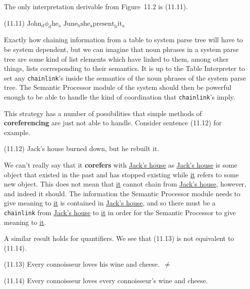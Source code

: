 \documentclass{article}
\begin{document}
The only interpretation derivable from Figure~11.2 is
(11.11).

\begin{enumerate*}
\item[(11.11)] ${\textrm{John}_{\textrm{d}}}$${\phi_{\textrm{d}}}$${\textrm{he}_{\textrm{a}}}$\qquad
${\textrm{June}_{\textrm{b}}}$${\textrm{she}_{\textrm{a}}}$\qquad ${\textrm{present}_{\textrm{b}}}$${\textrm{it}_{\textrm{a}}}$
\end{enumerate*}

Exactly how chaining information from a table to system parse
tree will have to be system dependent, but we can imagine that
noun phrases in a system parse tree are some kind of list
elements which have linked to them, among other things, lists
corresponding to their semantics. It is up to the Table
Interpreter to set any \texttt{chainlink}'s inside the semantics
of the noun phrases of the system parse tree. The Semantic
Processor module of the system should then be powerful enough to
be able to handle the kind of coordination that
\texttt{chainlink}'s imply.

This strategy has a number of possibilities that simple methods
of \textbf{coreferencing} are just not able to handle.  Consider
sentence (11.12) for example.

\begin{enumerate*}
\item[(11.12)] Jack's house burned down, but he rebuilt it.
\end{enumerate*}

We can't really say that it \textbf{corefers} with
\underline{Jack's house} as \underline{Jack's house} is some
object that existed in the past and has stopped existing while
\underline{it} refers to some new object.  This does not mean
that \underline{it} cannot chain from \underline{Jack's house},
however, and indeed it should. The information the Semantic
Processor module needs to give meaning to \underline{it} is
contained in \underline{Jack's house}, and so there must be a
\texttt{chainlink} from \underline{Jack's house} to
\underline{it} in order for the Semantic Processor to give
meaning to \underline{it}.

A similar result holds for quantifiers. We see that (11.13) is
not equivalent to (11.14).

\begin{enumerate*}
\item[(11.13)] Every connoisseur loves his wine and cheese.~${\ne}$
\item[(11.14)] Every connoisseur loves every connoisseur's wine
and cheese.
\end{enumerate*}
\end{document}
